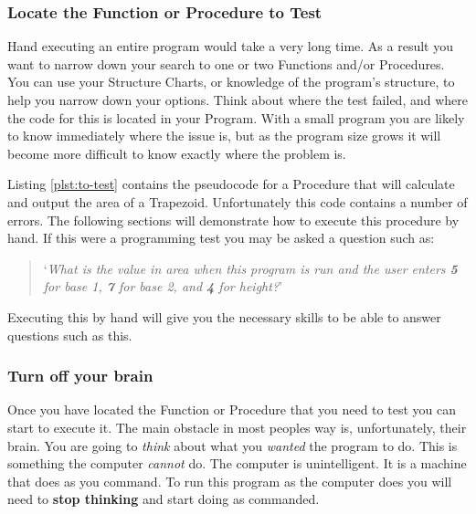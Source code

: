 \subsubsection{Locate the Function or Procedure to Test} %
\label{ssub:locate_the_function_or_procedure_to_test}

Hand executing an entire program would take a very long time. As a result you want to narrow down your search to one or two Functions and/or Procedures. You can use your Structure Charts, or knowledge of the program's structure, to help you narrow down your options. Think about where the test failed, and where the code for this is located in your Program. With a small program you are likely to know immediately where the issue is, but as the program size grows it will become more difficult to know exactly where the problem is.

Listing \ref{plst:to-test} contains the pseudocode for a Procedure that will calculate and output the area of a Trapezoid. Unfortunately this code contains a number of errors. The following sections will demonstrate how to execute this procedure by hand. If this were a programming test you may be asked a question such as:
\begin{quote}
  `\emph{What is the value in area when this program is run and the user enters \textbf{5} for base 1, \textbf{7} for base 2, and \textbf{4} for height?}'
\end{quote}

Executing this by hand will give you the necessary skills to be able to answer questions such as this.



\subsubsection{Turn off your brain} %
\label{ssub:turn_off_your_brain}

Once you have located the Function or Procedure that you need to test you can start to execute it. The main obstacle in most peoples way is, unfortunately, their brain. You are going to \emph{think} about what you \emph{wanted} the program to do. This is something the computer \emph{cannot} do. The computer is unintelligent. It is a machine that does as you command. To run this program as the computer does you will need to \textbf{stop thinking} and start doing as commanded.

